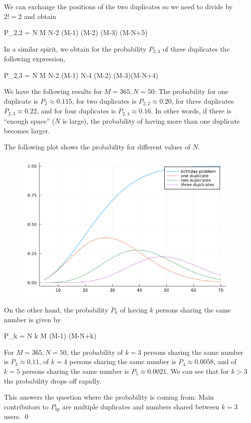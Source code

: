 We can exchange the positions of the two duplicates so we need to divide by $2! = 2$ and obtain

\bee
P_{2,2} =  {N } M {N-2 } (M-1) \times (M-2) \times (M-3) \times \cdots \times (M-N+5) 
\eee

In a similar spirit, we obtain for the probability $P_{2,3}$ of three duplicates the following expression,

\bee
P_{2,3} =   {N } M {N-2 } (M-1) {N-4 } (M-2) \times (M-3)\times \cdots \times (M-N+4) 
\eee

We have the following results for $M=365, N=50$: The probability for one duplicate is $P_2 \approx 0.115$, for two duplicates is $P_{2,2} \approx 0.20$, for three duplicates $P_{2,3} \approx 0.22$, and for four duplicates is $P_{2,4} \approx 0.16$. In other words, if there is ``enough space'' ($N$ is large), the probability of having more than one duplicate becomes larger.

The following plot shows the probability for different values of $N$.

\begin{figure}[H]
    \centering
    \includegraphics[scale=0.5]{images/2022-12-15-birthday_02.png}
\end{figure}

On the other hand, the probability $P_{k}$ of having $k$ persons sharing the same number is given by

\bee
P_{k} = {N \choose k} M \times (M-1) \times \cdots \times (M-N+k) 
\eee

For $M=365, N=50$, the probability of $k=3$ persons sharing the same number is $P_{3} \approx 0.11$, of $k=4$ persons sharing the same number is $P_{4} \approx 0.0058$, and of $k=5$ persons sharing the same number is $P_{5} \approx 0.0021$. We can see that for $k > 3$ the probability drops off rapidly.

This answers the question where the probability is coming from: Main contributors to $P_{bp}$ are multiple duplicates and numbers shared between $k=3$ users. \qed



